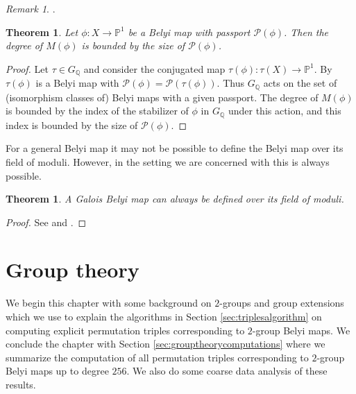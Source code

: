 \documentclass{dcthesis}
\newcommand{\PP}{\mathbb P}
\newcommand{\CC}{\mathbb C}
\newcommand{\QQ}{\mathbb Q}
\newcommand{\defi}[1]{\textsf{#1}}
\DeclareMathOperator{\Aut}{Aut}
\numberwithin{equation}{section}
\newtheorem{theorem}[equation]{Theorem}
\theoremstyle{definition}
\newtheorem{definition}[equation]{Definition}
\theoremstyle{remark}
\newtheorem{remark}[equation]{Remark}
\begin{document}
{{{\begin{remark}
      \cite{huggins}.
    \end{remark}
    \begin{theorem}\label{thm:fieldofmoduli}
      Let $\phi:X\to\PP^1$ be a Belyi map
      with passport $\mathcal{P}(\phi)$.
      Then the degree
      of $M(\phi)$
      is bounded by the size of
      $\mathcal{P}(\phi)$.
    \end{theorem}
    \begin{proof}
      Let $\tau\in G_\QQ$ and consider the
      conjugated map
      $\tau(\phi)\colon \tau(X)\to\PP^1$.
      By \cite[Appendix]{jones_streit_manfred}
      $\tau(\phi)$ is a Belyi map with
      $\mathcal{P}(\phi) =
      \mathcal{P}(\tau(\phi))$.
      Thus $G_\QQ$ acts on the set
      of (isomorphism classes of) Belyi maps with
      a given passport.
      The degree of $M(\phi)$
      is bounded by the index of the
      stabilizer of $\phi$ in $G_\QQ$
      under this action,
      and this index is bounded by
      the size of $\mathcal{P}(\phi)$.
    \end{proof}
    For a general Belyi map it may not be possible
    to define the Belyi map over its field
    of moduli.
    However,
    in the setting we are concerned with
    this is always possible.
    \begin{theorem}
      \label{thm:galoisbelyimapoverfieldofmoduli}
      A Galois Belyi map can always be defined over
      its field of moduli.
    \end{theorem}
    \begin{proof}
      See 
      \cite[Proposition 2.5]{coombes_harbater}
      and
      \cite[Theorem 2.2]{kock}.
    \end{proof}
  }
}
\chapter{Group theory}{\label{chapter:grouptheory}
  We begin this chapter with some background
  on $2$-groups and group extensions which we
  use to explain the algorithms
  in Section \ref{sec:triplesalgorithm}
  on computing explicit permutation
  triples corresponding to $2$-group Belyi maps.
  We conclude the chapter with 
  Section \ref{sec:grouptheorycomputations}
  where we summarize the computation
  of all permutation triples corresponding
  to $2$-group Belyi maps up to degree $256$.
  We also do some coarse data analysis of these
  results.
}}
\end{document}
